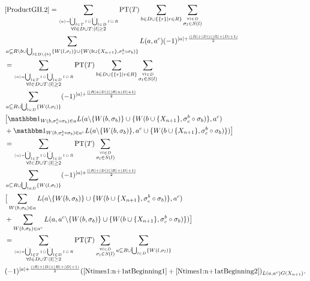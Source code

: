 \documentclass[b5paper,draft,openbib,12pt]{memoir}
\DeclareMathOperator{\dotCup}{\mathop{\dot{\bigcup}}}
\DeclareMathOperator{\dotcup}{\mathop{\dot{\cup}}}
\newcommand{\id}{{\mathbbm 1}}
\begin{document}
\begin{align}\notag
&\eqref{ProductGII.2}=\sum_{\stackrel{\langle n \rangle = \dotCup_{l\in T}l \dotcup \dotCup_{l\in D}l \dotcup R}{\forall l \in D\cup T: |l|\ge 2}} \text{PT}(T) \sum_{b\in D \cup \{\{r\}\mid r \in R\}} \sum_{\stackrel{\forall l \in D}{\sigma_l \in S(l)}}\\\notag
 &\sum_{a \subseteq R\backslash b \cup \bigcup_{l \in D\backslash \{b\}}\{W(l,\sigma_l)\} \cup \{W(b\cup \{X_{n+1}\},\sigma^b_c\circ \sigma_b)\}} L(a,a^c) (-1)^{|a|+ \frac{(|R|+|D|)(|R|+|D|+1)}{2}}\\\notag
 &=\sum_{\stackrel{\langle n \rangle = \dotCup_{l\in T}l \dotcup \dotCup_{l\in D}l \dotcup R}{\forall l \in D\cup T: |l|\ge 2}} \text{PT}(T) \sum_{b\in D \cup \{\{r\}\mid r \in R\}} \sum_{\stackrel{\forall l \in D}{\sigma_l \in S(l)}} \\\notag
 &\sum_{a \subseteq R \cup \bigcup_{l \in D}\{W(l,\sigma_l)\}} (-1)^{|a|+ \frac{(|R|+|D|)(|R|+|D|+1)}{2}} \\\notag
& \big[ \id_{W(b,\sigma^b_c\circ\sigma_b)\in a} L(a\backslash \{W(b,\sigma_b)\} \cup \{W(b\cup \{X_{n+1}\},\sigma^b_c \circ\sigma_b)\},a^c) \\\notag
& +\id_{W(b,\sigma^b_c\circ \sigma_b)\in a^c} L(a\backslash \{W(b,\sigma_b)\},a^c \cup \{W(b\cup \{X_{n+1}\},\sigma^b_c \circ \sigma_b)\}) \big]\\\notag
&=\sum_{\stackrel{\langle n \rangle = \dotCup_{l\in T}l \dotcup \dotCup_{l\in D}l \dotcup R}{\forall l \in D\cup T: |l|\ge 2}} \text{PT}(T)  \sum_{\stackrel{\forall l \in D}{\sigma_l \in S(l)}} \\\notag
 &\sum_{a \subseteq R \cup \bigcup_{l \in D}\{W(l,\sigma_l)\}} (-1)^{|a|+ \frac{(|R|+|D|)(|R|+|D|+1)}{2}}
  \\\notag
& \big[ \sum_{W(b,\sigma_b) \in a }L(a\backslash \{W(b,\sigma_b)\} \cup \{W(b\cup \{X_{n+1}\},\sigma^b_c \circ\sigma_b)\},a^c) \\\notag
&+  \sum_{W(b,\sigma_b) \in a^c } L(a,a^c \backslash \{W(b,\sigma_b)\} \cup \{W(b\cup \{X_{n+1}\},\sigma^b_c \circ \sigma_b)\}) \big]\\\notag
&=\sum_{\stackrel{\langle n \rangle = \dotCup_{l\in T}l \dotcup \dotCup_{l\in D}l \dotcup R}{\forall l \in D\cup T: |l|\ge 2}} \text{PT}(T)  \sum_{\stackrel{\forall l \in D}{\sigma_l \in S(l)}} \sum_{a \subseteq R \cup \bigcup_{l \in D}\{W(l,\sigma_l)\}} \\
 & (-1)^{|a|+ \frac{(|R|+|D|)(|R|+|D|+1)}{2}}
 (\eqref{Ntimes1:n+1atBeginning1}+\eqref{Ntimes1:n+1atBeginning2})_{L(a,a^c)G(X_{n+1})}.
\end{align}
\end{document}
